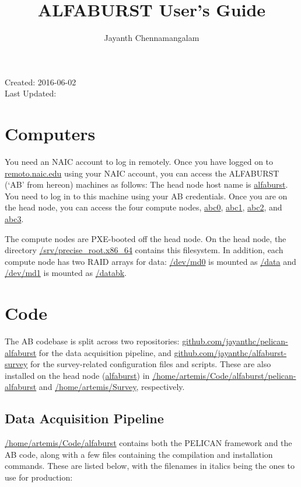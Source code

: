 \documentclass{article}
\title{ALFABURST User's Guide}
\author{Jayanth Chennamangalam}
\date{}
\begin{document}
\maketitle

\begin{center}
Created: 2016-06-02\\
\renewcommand*{\thefilemoddate}[3]{#1-#2-#3} 
Last Updated: \filemodprintdate{\jobname}
\end{center}

\tableofcontents

\section{Computers}

You need an NAIC account to log in remotely. Once you have logged on to
\url{remoto.naic.edu} using your NAIC account, you can access the ALFABURST
(`AB' from hereon) machines as follows: The head node host name is
\url{alfaburst}. You need to log in to this machine using your AB credentials.
Once you are on the head node, you can access the four compute nodes,
\url{abc0}, \url{abc1}, \url{abc2}, and \url{abc3}.

The compute nodes are PXE-booted off the head node. On the head node, the
directory \url{/srv/precise_root.x86_64} contains this filesystem. In addition,
each compute node has two RAID arrays for data: \url{/dev/md0} is mounted as
\url{/data} and \url{/dev/md1} is mounted as \url{/databk}.


\section{Code}

The AB codebase is split across two repositories:
\url{github.com/jayanthc/pelican-alfaburst} for the data acquisition pipeline,
and \url{github.com/jayanthc/alfaburst-survey} for the survey-related
configuration files and scripts. These are also installed on the head node
(\url{alfaburst}) in \url{/home/artemis/Code/alfaburst/pelican-alfaburst} and
\url{/home/artemis/Survey}, respectively.

\subsection{Data Acquisition Pipeline}

\url{/home/artemis/Code/alfaburst} contains both the PELICAN framework and the AB
code, along with a few files containing the compilation and installation
commands. These are listed below, with the filenames in italics being the ones
to use for production:
\end{document}
